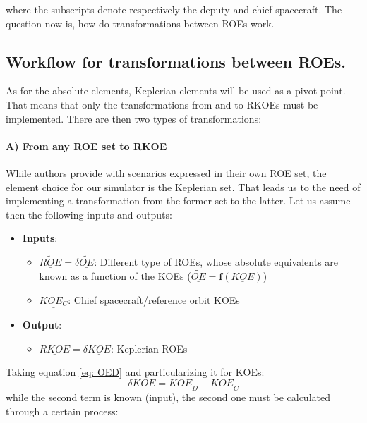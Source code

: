 \noindent where the subscripts denote respectively the deputy and chief spacecraft. The question now is, how do transformations between ROEs work.\\
%
\subsection{Workflow for transformations between ROEs. }\label{sec: Workflow_ROE}
%
\indent As for the absolute elements, Keplerian elements will be used as a pivot point. That means that only the transformations from and to RKOEs must be implemented. There are then two types of transformations:
%
\paragraph{A) From any ROE set to RKOE\\}
%
\label{par: 	ROE2RKOE}
\indent While authors provide with scenarios expressed in their own ROE set, the element choice for our simulator is the Keplerian set. That leads us to the need of implementing a transformation from the former set to the latter. Let us assume then the following inputs and outputs:
%
\begin{itemize}
\item \textbf{Inputs}: 
%
	\begin{itemize}
	\item $\underline{\widetilde{ROE}}= \delta \underline{\widetilde{OE}}$: Different type of ROEs, whose absolute equivalents are known as a function of the KOEs ($\underline{\widetilde{OE}} = \bm{f} \left( \underline{KOE}\right)$)
	\item $\underline{KOE_{C}}$: Chief spacecraft/reference orbit KOEs
	\end{itemize}
%
\item \textbf{Output}: 
%
	\begin{itemize}
	\item $\underline{RKOE} = \delta \underline{KOE}$: Keplerian ROEs
	\end{itemize}
\end{itemize}
%
\indent Taking equation \eqref{eq: OED} and particularizing it for KOEs:
%
\begin{equation}
\delta \underline{KOE} = \underline{KOE}_D - \underline{KOE}_C
\end{equation}
%
\noindent while the second term is known (input), the second one must be calculated through a certain process:
%
